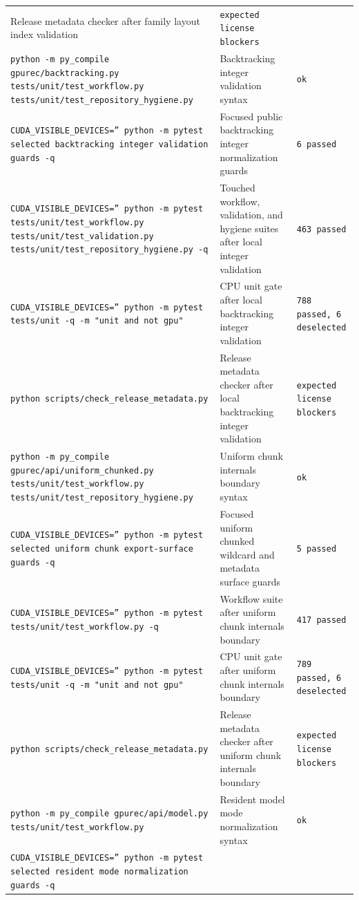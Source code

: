 \documentclass[11pt]{article}
\begin{document}
\begin{center}
\begin{tabular}{lll}
Release metadata checker after family layout index validation &
\texttt{expected license blockers} \\
\texttt{python -m py\_compile gpurec/backtracking.py tests/unit/test\_workflow.py tests/unit/test\_repository\_hygiene.py} &
Backtracking integer validation syntax &
\texttt{ok} \\
\texttt{CUDA\_VISIBLE\_DEVICES='' python -m pytest selected backtracking integer validation guards -q} &
Focused public backtracking integer normalization guards &
\texttt{6 passed} \\
\texttt{CUDA\_VISIBLE\_DEVICES='' python -m pytest tests/unit/test\_workflow.py tests/unit/test\_validation.py tests/unit/test\_repository\_hygiene.py -q} &
Touched workflow, validation, and hygiene suites after local integer validation &
\texttt{463 passed} \\
\texttt{CUDA\_VISIBLE\_DEVICES='' python -m pytest tests/unit -q -m "unit and not gpu"} &
CPU unit gate after local backtracking integer validation &
\texttt{788 passed, 6 deselected} \\
\texttt{python scripts/check\_release\_metadata.py} &
Release metadata checker after local backtracking integer validation &
\texttt{expected license blockers} \\
\texttt{python -m py\_compile gpurec/api/uniform\_chunked.py tests/unit/test\_workflow.py tests/unit/test\_repository\_hygiene.py} &
Uniform chunk internals boundary syntax &
\texttt{ok} \\
\texttt{CUDA\_VISIBLE\_DEVICES='' python -m pytest selected uniform chunk export-surface guards -q} &
Focused uniform chunked wildcard and metadata surface guards &
\texttt{5 passed} \\
\texttt{CUDA\_VISIBLE\_DEVICES='' python -m pytest tests/unit/test\_workflow.py -q} &
Workflow suite after uniform chunk internals boundary &
\texttt{417 passed} \\
\texttt{CUDA\_VISIBLE\_DEVICES='' python -m pytest tests/unit -q -m "unit and not gpu"} &
CPU unit gate after uniform chunk internals boundary &
\texttt{789 passed, 6 deselected} \\
\texttt{python scripts/check\_release\_metadata.py} &
Release metadata checker after uniform chunk internals boundary &
\texttt{expected license blockers} \\
\texttt{python -m py\_compile gpurec/api/model.py tests/unit/test\_workflow.py} &
Resident model mode normalization syntax &
\texttt{ok} \\
\texttt{CUDA\_VISIBLE\_DEVICES='' python -m pytest selected resident mode normalization guards -q} &

\end{tabular}
\end{center}
\end{document}
